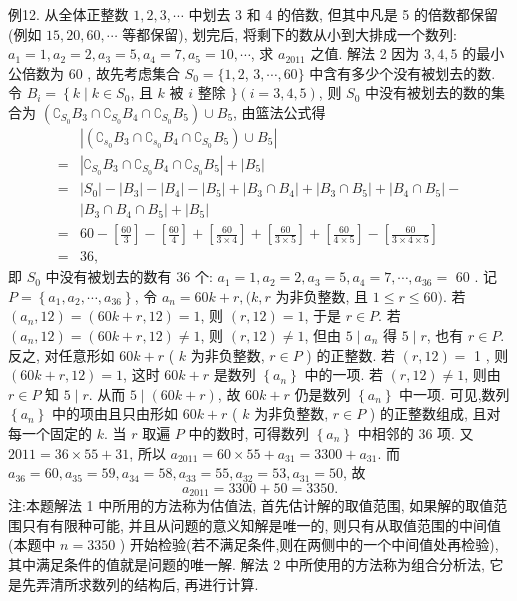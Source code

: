 例12. 从全体正整数 $1,2,3, \cdots$ 中划去 3 和 4 的倍数, 但其中凡是 5 的倍数都保留 (例如 $15,20,60, \cdots$ 等都保留), 划完后, 将剩下的数从小到大排成一个数列: $a_1=1, a_2=2, a_3=5, a_4=7, a_5=10, \cdots$, 求 $a_{2011}$ 之值.
解法 2 因为 $3,4,5$ 的最小公倍数为 60 , 故先考虑集合 $S_0=\{1,2$, $3, \cdots, 60\}$ 中含有多少个没有被划去的数.
令 $B_i=\left\{k \mid k \in S_0\right.$, 且 $k$ 被 $i$ 整除 $\} (i=3,4,5)$, 则 $S_0$ 中没有被划去的数的集合为 $\left(\complement_{S_0} B_3 \cap \complement_{S_0} B_4 \cap \complement_{S_0} B_5\right) \cup B_5$, 由篮法公式得
$$
\begin{aligned}
& \left|\left(\complement_{s_0} B_3 \cap \complement_{s_0} B_4 \cap \complement_{S_0} B_5\right) \cup B_5\right| \\
= & \left|\complement_{S_0} B_3 \cap \complement_{S_0} B_4 \cap \complement_{S_0} B_5\right|+\left|B_5\right| \\
= & \left|S_0\right|-\left|B_3\right|-\left|B_4\right|-\left|B_5\right|+\left|B_3 \cap B_4\right|+\left|B_3 \cap B_5\right|+\left|B_4 \cap B_5\right|- \\
& \left|B_3 \cap B_4 \cap B_5\right|+\left|B_5\right| \\
= & 60-\left[\frac{60}{3}\right]-\left[\frac{60}{4}\right]+\left[\frac{60}{3 \times 4}\right]+\left[\frac{60}{3 \times 5}\right]+\left[\frac{60}{4 \times 5}\right]-\left[\frac{60}{3 \times 4 \times 5}\right] \\
= & 36,
\end{aligned}
$$
即 $S_0$ 中没有被划去的数有 36 个: $a_1=1, a_2=2, a_3=5, a_4=7, \cdots, a_{36}=$ 60 . 记 $P=\left\{a_1, a_2, \cdots, a_{36}\right\}$, 令 $a_n=60 k+r,(k, r$ 为非负整数, 且 $1 \leqslant r \leqslant 60)$.
若 $\left(a_n, 12\right)=(60 k+r, 12)=1$, 则 $(r, 12)=1$, 于是 $r \in P$. 若 $\left(a_n,12\right)=(60 k+r, 12) \neq 1$, 则 $(r, 12) \neq 1$, 但由 $5 \mid a_n$ 得 $5 \mid r$, 也有 $r \in P$.
反之, 对任意形如 $60 k+r$ ( $k$ 为非负整数, $r \in P$ ) 的正整数.
若 $(r, 12)=$ 1 , 则 $(60 k+r, 12)=1$, 这时 $60 k+r$ 是数列 $\left\{a_n\right\}$ 中的一项.
若 $(r, 12) \neq 1$, 则由 $r \in P$ 知 $5 \mid r$. 从而 $5 \mid(60 k+r)$, 故 $60 k+r$ 仍是数列 $\left\{a_n\right\}$ 中一项.
可见,数列 $\left\{a_n\right\}$ 中的项由且只由形如 $60 k+r$ ( $k$ 为非负整数, $r \in P$ ) 的正整数组成, 且对每一个固定的 $k$. 当 $r$ 取遍 $P$ 中的数时, 可得数列 $\left\{a_n\right\}$ 中相邻的 36 项.
又 $2011=36 \times 55+31$, 所以 $a_{2011}=60 \times 55+a_{31}=3300+a_{31}$. 而 $a_{36}=60, a_{35}=59, a_{34}=58, a_{33}=55, a_{32}=53, a_{31}=50$, 故
$$
a_{2011}=3300+50=3350 .
$$
注:本题解法 1 中所用的方法称为估值法, 首先估计解的取值范围, 如果解的取值范围只有有限种可能, 并且从问题的意义知解是唯一的, 则只有从取值范围的中间值 (本题中 $n=3350$ ) 开始检验(若不满足条件,则在两侧中的一个中间值处再检验), 其中满足条件的值就是问题的唯一解.
解法 2 中所使用的方法称为组合分析法, 它是先弄清所求数列的结构后, 再进行计算.


